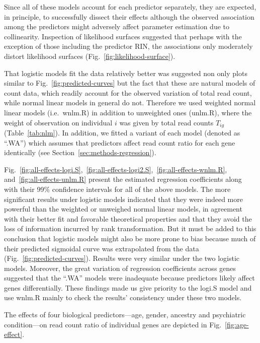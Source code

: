 \documentclass[letterpaper]{article}
\begin{document}
Since all of these models account for each predictor separately, they are
expected, in principle, to successfully dissect their effects although the
observed association among the predictors might adversely affect parameter
estimation due to collinearity.  Inspection of likelihood surfaces suggested
that perhaps with the exception of those including the predictor RIN, the
associations only moderately distort likelihood surfaces
(Fig.~\ref{fig:likelihood-surface}).

That logistic models fit the data relatively better was suggested non only plots
similar to Fig.~\ref{fig:predicted-curves} but the fact that these are natural
models of count data, which readily account for the observed variation of
total read count, while normal linear models in general do not.  Therefore we
used weighted normal linear models (i.e.~wnlm.R) in addition to unweighted
ones (unlm.R), where the weight of observation on individual \(i\) was given
by total read counts \(T_{ig}\) (Table~\ref{tab:nlm}).  In addition, we fitted
a variant of each model (denoted as ``.WA'') which assumes that predictors
affect read count ratio for each gene identically (see
Section~\ref{sec:methods-regression}).

Fig.~\ref{fig:all-effects-logi.S},~\ref{fig:all-effects-logi2.S},~\ref{fig:all-effects-wnlm.R},
and~\ref{fig:all-effects-unlm.R} present the estimated regression coefficients
along with their 99\% confidence intervals for all of the above models.  The
more significant results under logistic models indicated that they were indeed
more powerful than the weighted or unweighed normal linear models, in
agreement with their better fit and favorable theoretical properties and that
they avoid the loss of information incurred by rank transformation.  But it
must be added to this conclusion that logistic models might also be more prone
to bias because much of their predicted sigmoidal curve was extrapolated from
the data (Fig.~\ref{fig:predicted-curves}).  Results were very similar under
the two logistic models.  Moreover, the great variation of regression
coefficients across genes suggested that the ``.WA'' models were inadequate
because predictors likely affect genes differentially.  These findings made us
give priority to the logi.S model and use wnlm.R mainly to check the results'
consistency under these two models.

The effects of four biological predictors---age, gender, ancestry and
psychiatric condition---on read count ratio of individual genes are depicted
in Fig.~\ref{fig:age-effect}.
\end{document}
